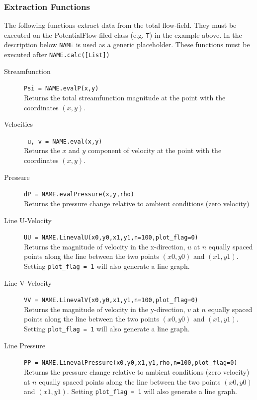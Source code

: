 \documentclass[10pt,a4paper]{article}
\begin{document}
\subsubsection{Extraction Functions}\label{S_extract}
The following functions extract data from the total flow-field.
They must be executed on the PotentialFlow-filed class (e.g. \verb'T') in the example above.  
In the description below \verb'NAME' is used as a generic placeholder. 
These functions must be executed after \verb'NAME.calc([List])'
\begin{description}
\item[Streamfunction] \verb'Psi = NAME.evalP(x,y)'\\
Returns the total streamfunction magnitude at the point with the coordinates $(x, y)$.

\item[Velocities] \verb' u, v = NAME.eval(x,y)' \\
Returns the $x$ and $y$ component of velocity at the point with the coordinates $(x, y)$.

\item[Pressure] \verb'dP = NAME.evalPressure(x,y,rho)'\\
Returns the pressure change relative to ambient conditions (zero velocity)

\item[Line U-Velocity] \verb'UU = NAME.LinevalU(x0,y0,x1,y1,n=100,plot_flag=0)' \\
Returns the magnitude of velocity in the x-direction, $u$ at $n$ equally spaced points along the line between the two points $(x0, y0)$ and $(x1,y1)$. 
Setting \verb'plot_flag = 1' will also generate a line graph.

\item[Line V-Velocity] \verb'VV = NAME.LinevalV(x0,y0,x1,y1,n=100,plot_flag=0)' \\
Returns the magnitude of velocity in the y-direction, $v$ at $n$ equally spaced points along the line between the two points $(x0, y0)$ and $(x1,y1)$.
Setting \verb'plot_flag = 1' will also generate a line graph.

\item[Line Pressure]  \verb'PP = NAME.LinevalPressure(x0,y0,x1,y1,rho,n=100,plot_flag=0)' \\
Returns the pressure change relative to ambient conditions (zero velocity) at $n$ equally spaced points along the line between the two points $(x0, y0)$ and $(x1,y1)$.
Setting \verb'plot_flag = 1' will also generate a line graph.

\end{description}
\end{document}
